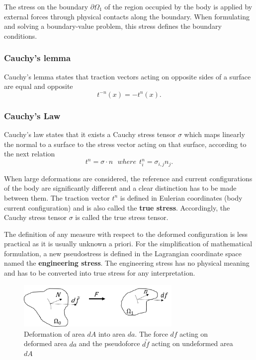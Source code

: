 The stress on the boundary $\partial \Omega_1$ of the region occupied by the body is applied by external forces through physical contacts along the boundary. When formulating and solving a boundary-value problem, this stress defines the boundary conditions.


\subsubsection*{Cauchy's lemma}

Cauchy's lemma states that traction vectors acting on opposite sides of a surface are equal and opposite
\begin{equation}
t^{-n}(x) = -t^n(x).
\label{chauchyLemma}
\end{equation}
\subsubsection*{Cauchy's Law}
Cauchy’s law states that it exists a Cauchy stress tensor $\sigma$ which maps linearly the normal to a surface to the stress vector acting on that surface, according to the next relation
\begin{equation}
t^n = \sigma \cdot n \ \ \ where \  \ t^n_i = \sigma_{i,j} n_j.
\end{equation}

When large deformations are considered, the reference and current configurations of the body are significantly different and a clear distinction has to be made between them. The traction vector $t^n$ is defined in Eulerian coordinates (body current configuration) and is also called the \textbf{true stress}. Accordingly, the Cauchy stress tensor $\sigma$ is called the true stress tensor.

The definition of any measure with respect to the deformed configuration is less practical as it is usually unknown a priori. For the simplification of mathematical formulation, a new pseudostress is defined in the Lagrangian coordinate space named the \textbf{engineering stress}. The engineering stress has no physical meaning and has to be converted into true stress for any interpretation.


\begin{figure}
\begin{center}
\includegraphics[width=0.7\textwidth,keepaspectratio]{figures/stressnotion.png} 
\caption[]{Deformation of area $dA$  into area $da$. The force $df$ acting on deformed area $da$ and the pseudoforce $d\tilde{f}$ acting on undeformed area $dA$}
\label{stressnotion}
\end{center}
\end{figure} 


